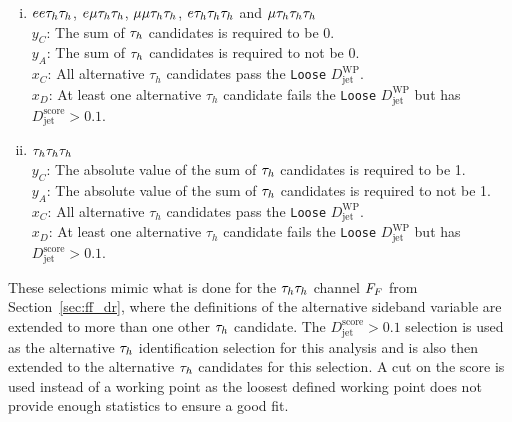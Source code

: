 \begin{enumerate}[i)]
   \item $ee\tau_{h}\tau_{h}$, $e\mu\tau_{h}\tau_{h}$, $\mu\mu\tau_{h}\tau_{h}$, $e\tau_{h}\tau_{h}\tau_{h}$ and $\mu\tau_{h}\tau_{h}\tau_{h}$  \\
     \indent $y_C$: The sum of $\tau_{h}$ candidates is required to be 0. \\
     \indent $y_A$: The sum of $\tau_{h}$ candidates is required to not be 0. \\
     \indent $x_C$: All alternative $\tau_h$ candidates pass the \texttt{Loose} $D_{\text{jet}}^{\text{WP}}$. \\
     \indent $x_D$: At least one alternative $\tau_h$ candidate fails the \texttt{Loose} $D_{\text{jet}}^{\text{WP}}$ but has $D_{\text{jet}}^{\text{score}} > 0.1$.
  \item $\tau_{h}\tau_{h}\tau_{h}$ \\
     \indent $y_C$: The absolute value of the sum of $\tau_{h}$ candidates is required to be 1. \\
     \indent $y_A$: The absolute value of the sum of $\tau_{h}$ candidates is required to not be 1. \\
     \indent $x_C$: All alternative $\tau_h$ candidates pass the \texttt{Loose} $D_{\text{jet}}^{\text{WP}}$. \\
     \indent $x_D$: At least one alternative $\tau_h$ candidate fails the \texttt{Loose} $D_{\text{jet}}^{\text{WP}}$ but has $D_{\text{jet}}^{\text{score}} > 0.1$.
\end{enumerate}

These selections mimic what is done for the $\tau_{h}\tau_{h}$ channel $F_{F}$ from Section~\ref{sec:ff_dr}, where the definitions of the alternative sideband variable are extended to more than one other $\tau_{h}$ candidate.
The $D_{\text{jet}}^{\text{score}} > 0.1$ selection is used as the alternative $\tau_{h}$ identification selection for this analysis and is also then extended to the alternative $\tau_{h}$ candidates for this selection.
A cut on the score is used instead of a working point as the loosest defined working point does not provide enough statistics to ensure a good fit. \\

